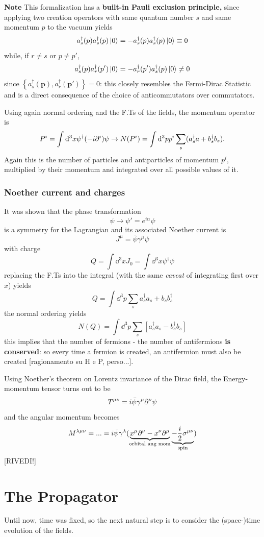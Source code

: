 \textbf{Note} This formalization has a \textbf{built-in Pauli exclusion principle,
} since applying two creation operators with same quantum number $s$ and same
momentum $p$ to the vacuum yields
$$a^\dagger_s(p)a^\dagger_s(p)\ket{0} = -a^\dagger_s(p)a^\dagger_s(p)\ket{0}
\equiv 0$$
while, if $r\neq s$ or $p\neq p'$,
$$a^\dagger_s(p)a^\dagger_r(p')\ket{0} = -a^\dagger_r(p')a^\dagger_s(p)\ket{0}
\neq0$$
since $\left\{a_s^\dagger(\mathbf{p}),a_r^\dagger(\mathbf{p'})\right\}=0$: this
closely resembles the Fermi-Dirac Statistic and is a direct consequence of the
choice of anticommutators over commutators.

Using again normal ordering and the F.Ts of the fields, the momentum operator
is
$$P^i = \int \dd^3x\psi^\dagger(-i\partial^i)\psi\to
N(P^i) = \int \dd^3pp^i\sum_{s}^{}(a^\dagger_sa+b^\dagger_sb_s).$$
Again this is the number of particles and antiparticles of momentum
$p^i$, multiplied by their momentum and integrated over all possible
values of it.
\subsubsection{Noether current and charges}
It was shown that the phase transformation
$$\psi\to \psi'=e^{i\alpha}\psi$$
is a symmetry for the Lagrangian and its associated Noether current is
$$J^\mu = \bar\psi\gamma^\mu\psi$$
with charge
$$Q = \int \dd^3x J_0 = \int \dd ^3x \psi^\dagger\psi$$
replacing the F.Ts into the integral (with the same \textit{caveat} of integrating
first over $x$) yields
$$Q = \int \dd^3p \sum_{s}^{}a^\dagger_sa_s + b_sb_s^\dagger$$
the normal ordering yields
$$N(Q) = \int \dd^3p \sum_{s}^{}\left[a^\dagger_sa_s - b_s^\dagger b_s\right]$$
this implies that the number of fermions - the number of antifermions \textbf{is
conserved}: so every time a fermion is created, an antifermion must also be
created [ragionamento su H e P, perso...].

Using Noether's theorem on Lorentz invariance of the Dirac field, the
Energy-momentum tensor turns out to be
$$T^{\mu\nu} = i\bar\psi\gamma^\mu\partial^\nu\psi$$
and the angular momentum becomes
$$M^{\lambda\mu\nu} = ... = i\bar\psi\gamma^\lambda(\underbrace{x^\mu\partial^\nu -
x^\nu\partial^\mu}_{\text{orbital ang mom}} \underbrace{-\frac{i}{2}\sigma^
{\mu\nu}}_\text{spin})$$
[RIVEDI!]
\section{The Propagator}
Until now, time was fixed, so the next natural step is to consider the
(space-)time evolution of the fields.

